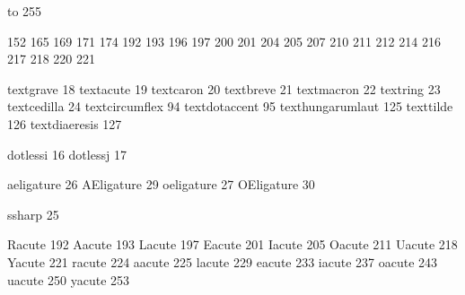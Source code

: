 

\startmapping[il2]

 to 255    %

 152
 165
 169
 171
 174
 192
 193
 196
 197
 200
 201
 204
 205
 207
 210
 211
 212
 214
 216
 217
 218
 220
 221

\stopmapping

\startcoding[il2][il2]

 textgrave          18
 textacute          19
 textcaron          20
 textbreve          21
 textmacron         22
 textring           23
 textcedilla        24
 textcircumflex     94
 textdotaccent      95
 texthungarumlaut  125
 texttilde         126
 textdiaeresis     127

 dotlessi       16
 dotlessj       17

 aeligature     26
 AEligature     29
 oeligature     27
 OEligature     30

 ssharp         25

 Racute        192
 Aacute        193
 Lacute        197
 Eacute        201
 Iacute        205
 Oacute        211
 Uacute        218
 Yacute        221
 racute        224
 aacute        225
 lacute        229
 eacute        233
 iacute        237
 oacute        243
 uacute        250
 yacute        253

